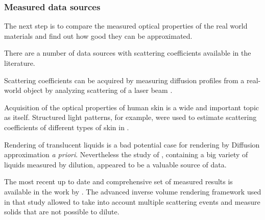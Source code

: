 \subsubsection{Measured data sources}
The next step is to compare the measured optical properties of the real world materials and find out
how good they can be approximated.

There are a number of data sources with scattering coefficients available in the literature.
 
Scattering coefficients can be acquired by measuring diffusion profiles from a real-world object by
analyzing scattering of a laser beam \cite{Jensen:2001:PMS:383259.383319}.

Acquisition of the optical properties of human skin is a wide and important topic as
itself. Structured light patterns, for example, were used to estimate scattering coefficients of
different types of skin in \cite{tariq_efficient_2006-1}.

Rendering of translucent liquids is a bad potential case for rendering by Diffusion approximation
\textit{a priori}. Nevertheless the study of \cite{Narasimhan:2006:ASP:1141911.1141986}, containing
a big variety of liquids measured by dilution, appeared to be a valuable source of data.

The most recent up to date and comprehensive set of measured results is available in the work by
\cite{Gkioulekas:2013:IVR:2508363.2508377}. The advanced inverse volume rendering framework used in
that study allowed to take into account multiple scattering events and measure solids that are not
possible to dilute.

